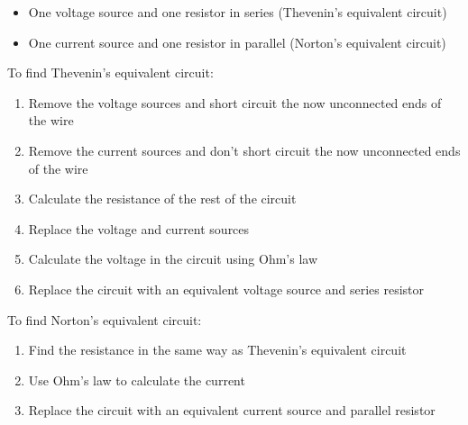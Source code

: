 \documentclass{article}
\begin{document}
    \begin{itemize}
        \item One voltage source and one resistor in series (Thevenin's equivalent circuit)
        \item One current source and one resistor in parallel (Norton's equivalent circuit)
    \end{itemize}

    To find Thevenin's equivalent circuit:
    
    \begin{enumerate}
        \item Remove the voltage sources and short circuit the now unconnected ends of the wire
        \item Remove the current sources and don't short circuit the now unconnected ends of the wire
        \item Calculate the resistance of the rest of the circuit
        \item Replace the voltage and current sources
        \item Calculate the voltage in the circuit using Ohm's law
        \item Replace the circuit with an equivalent voltage source and series resistor
    \end{enumerate}

    To find Norton's equivalent circuit:
    
    \begin{enumerate}
        \item Find the resistance in the same way as Thevenin's equivalent circuit
        \item Use Ohm's law to calculate the current
        \item Replace the circuit with an equivalent current source and parallel resistor
    \end{enumerate}
\end{document}
